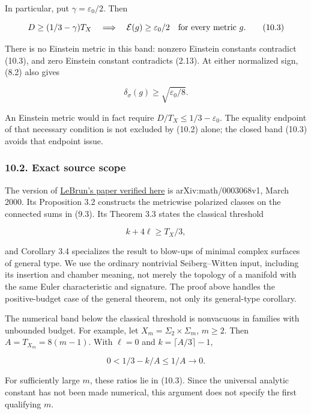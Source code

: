 \documentclass[
  10pt,
]{article}
\begin{document}
In particular, put \(\gamma=\varepsilon_0/2\). Then

\[
             D\ge(1/3-\gamma)T_X
 \quad\Longrightarrow\quad
             \mathcal E(g)\ge\varepsilon_0/2
             \quad\hbox{for every metric }g.             \tag{10.3}
\]

There is no Einstein metric in this band: nonzero Einstein constants
contradict (10.3), and zero Einstein constant contradicts (2.13). At
either normalized sign, (8.2) also gives

\[
                    \delta_\sigma(g)\ge\sqrt{\varepsilon_0/8}.
 \tag{10.4}
\]

An Einstein metric would in fact require \(D/T_X\le1/3-\varepsilon_0\).
The equality endpoint of that necessary condition is not excluded by
(10.2) alone; the closed band (10.3) avoids that endpoint issue.

\hypertarget{exact-source-scope}{%
\subsubsection{10.2. Exact source scope}\label{exact-source-scope}}

The version of \href{https://arxiv.org/pdf/math/0003068}{LeBrun's paper
verified here} is arXiv:math/0003068v1, March 2000. Its Proposition 3.2
constructs the metricwise polarized classes on the connected sums in
(9.3). Its Theorem 3.3 states the classical threshold

\[
                              k+4\ell\ge T_X/3,
\]

and Corollary 3.4 specializes the result to blow-ups of minimal complex
surfaces of general type. We use the ordinary nontrivial Seiberg--Witten
input, including its insertion and chamber meaning, not merely the
topology of a manifold with the same Euler characteristic and signature.
The proof above handles the positive-budget case of the general theorem,
not only its general-type corollary.

The numerical band below the classical threshold is nonvacuous in
families with unbounded budget. For example, let
\(X_m=\Sigma_2\times\Sigma_m\), \(m\ge2\). Then \(A=T_{X_m}=8(m-1)\).
With \(\ell=0\) and \(k=\lceil A/3\rceil-1\),

\[
                       0<1/3-k/A\le1/A\longrightarrow0.
\]

For sufficiently large \(m\), these ratios lie in (10.3). Since the
universal analytic constant has not been made numerical, this argument
does not specify the first qualifying \(m\).
\end{document}
